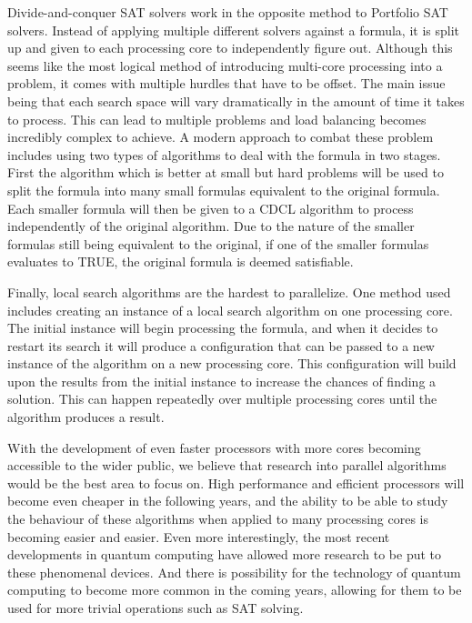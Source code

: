\documentclass{article}
\begin{document}
    Divide-and-conquer SAT solvers work in the opposite method to Portfolio SAT solvers. Instead of applying multiple different solvers
    against a formula, it is split up and given to each processing core to independently figure out. Although this seems like the most
    logical method of introducing multi-core processing into a problem, it comes with multiple hurdles that have to be offset. The main issue
    being that each search space will vary dramatically in the amount of time it takes to process. This can lead to multiple
    problems and load balancing becomes incredibly complex to achieve\cite{parallel}. A modern approach to combat these problem includes using two types of
    algorithms to deal with the formula in two stages. First the algorithm which is better at small but hard problems will be used to split
    the formula into many small formulas equivalent to the original formula. Each smaller formula will then be given to a CDCL
    algorithm to process independently of the original algorithm. Due to the nature of the smaller formulas still being equivalent to the
    original, if one of the smaller formulas evaluates to TRUE, the original formula is deemed satisfiable\cite{div}.

    Finally, local search algorithms are the hardest to parallelize. One method used includes creating an instance of a local search
    algorithm on one processing core. The initial instance will begin processing the formula, and when it decides to restart its search it
    will produce a configuration that can be passed to a new instance of the algorithm on a new processing core. This configuration will
    build upon the results from the initial instance to increase the chances of finding a solution. This can happen repeatedly over multiple
    processing cores until the algorithm produces a result\cite{local}.

    With the development of even faster processors with more cores becoming accessible to the wider public, we believe that research into
    parallel algorithms would be the best area to focus on. High performance and efficient processors will become even cheaper in the
    following years, and the ability to be able to study the behaviour of these algorithms when applied to many processing cores is becoming
    easier and easier. Even more interestingly, the most recent developments in quantum computing have allowed more research to be put to
    these phenomenal devices. And there is possibility for the technology of quantum computing to become more common in the coming years,
    allowing for them to be used for more trivial operations such as SAT solving.
\end{document}
